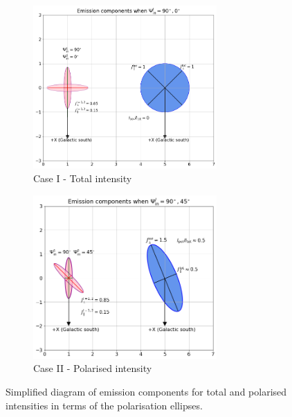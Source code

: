 \documentclass[12pt, a4 paper]{article}
\begin{document}
\begin{figure}[h!]
     \centering
     \begin{subfigure}{0.4\textwidth}
         \centering
         \includegraphics[width = 7cm]{Images/Total_intensity_Ellipses_circles_emissions.png}
         \caption{Case I - Total intensity}
         \label{fig_tot_intensity}
     \end{subfigure}
  \hfill
    \begin{subfigure}{0.4\textwidth}
         \centering
         \includegraphics[width = 7cm]{Images/Pol_intensity_Ellipses_circles_emissions.png}
         \caption{Case II - Polarised intensity}
         \label{fig_pol_intensity}
     \end{subfigure}
     \hfill
    \caption{Simplified diagram of emission components for total and polarised intensities in terms of the polarisation ellipses.}
\end{figure}

\newpage
\end{document}
